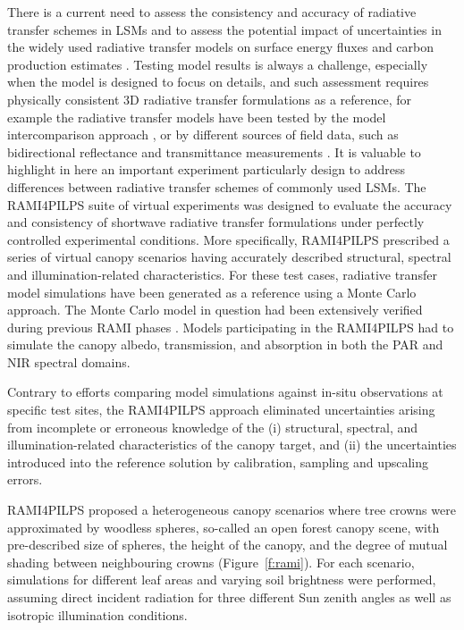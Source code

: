 There is a current need to assess the consistency and accuracy of radiative transfer schemes in LSMs and to assess the potential impact of uncertainties in the widely used radiative transfer models on surface energy fluxes and carbon production estimates \citep{loew2014}. Testing model results is always a challenge, especially when the model is designed to focus on details, and such assessment requires physically consistent 3D radiative transfer formulations as a reference, for example the radiative transfer models have been tested by the model intercomparison approach \citep{Pinty2001,Pinty2004,Widlowski2007,Widlowski2011,Widlowski2013}, or by different sources of field data, such as bidirectional reflectance \citep{North1996} and transmittance measurements \citep{Wang1990,Law2001,Kobayashi2012}. It is valuable to highlight in here an important experiment particularly design to address differences between radiative transfer schemes of commonly used LSMs. The RAMI4PILPS \citep{Widlowski2011} suite of virtual experiments was designed to evaluate the accuracy and consistency of shortwave radiative transfer formulations under perfectly controlled experimental conditions. More specifically, RAMI4PILPS prescribed a series of virtual canopy scenarios having accurately described structural, spectral and illumination-related characteristics. For these test cases, radiative transfer model simulations have been generated as a reference using a Monte Carlo approach. The Monte Carlo model in question had been extensively verified during previous RAMI phases \citep{Widlowski2007}. Models participating in the RAMI4PILPS had to simulate the canopy albedo, transmission, and absorption in both the PAR and NIR spectral domains. 

Contrary to efforts comparing model simulations against in-situ observations at specific test sites, the RAMI4PILPS approach eliminated uncertainties arising from incomplete or erroneous knowledge of the (i) structural, spectral, and illumination-related characteristics of the canopy target, and (ii) the uncertainties introduced into the reference solution by calibration, sampling and upscaling errors. 

RAMI4PILPS proposed a heterogeneous canopy scenarios where tree crowns were approximated by woodless spheres, so-called an open forest canopy scene, with pre-described size of spheres, the height of the canopy, and the degree of mutual shading between neighbouring crowns (Figure~\ref{f:rami}). For each scenario, simulations for different leaf areas and varying soil brightness were performed, assuming direct incident radiation for three different Sun zenith angles as well as isotropic illumination conditions.

